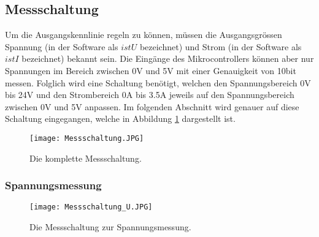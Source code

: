 \subsection{Messschaltung}

Um die Ausgangskennlinie regeln zu können, müssen die Ausgangsgrössen Spannung (in der Software als $istU$ bezeichnet) und Strom (in der Software als $istI$ bezeichnet) bekannt sein. Die Eingänge des Mikrocontrollers können aber nur Spannungen im Bereich zwischen 0V und 5V mit einer Genauigkeit von 10bit messen. Folglich wird eine Schaltung benötigt, welchen den Spannungsbereich 0V bis 24V und den Strombereich 0A bis 3.5A jeweils auf den Spannungsbereich zwischen 0V und 5V anpassen. Im folgenden Abschnitt wird genauer auf diese Schaltung eingegangen, welche in Abbildung \ref{fig:Messschaltung} dargestellt ist.
\begin{figure}[h]
	\centering
		\texttt{[image: Messschaltung.JPG]}
	\caption{Die komplette Messschaltung.}
	\label{fig:Messschaltung}
\end{figure}


\subsubsection{Spannungsmessung}
\begin{figure}[h]
	\centering
		\texttt{[image: Messschaltung\_U.JPG]}
	\caption{Die Messschaltung zur Spannungsmessung.}
	\label{fig:Messschaltung_U}
\end{figure}

